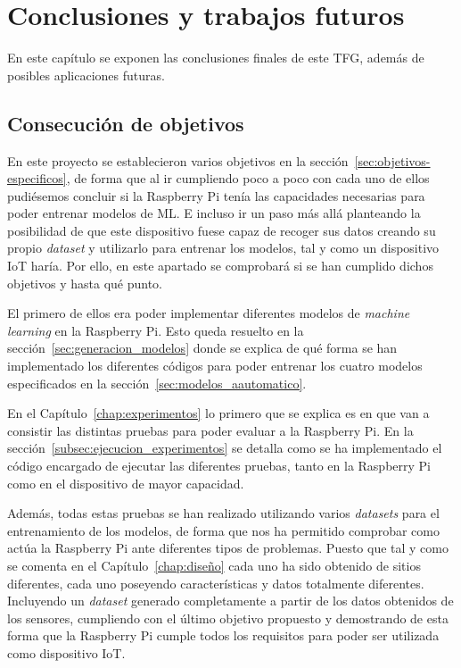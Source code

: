\documentclass[a4paper, 12pt]{book}
\begin{document}
\cleardoublepage



\chapter{Conclusiones y trabajos futuros}
\label{chap:conclusiones}

En este capítulo se exponen las conclusiones finales de este TFG, además de posibles aplicaciones futuras.

\section{Consecución de objetivos}
\label{sec:consecucion-objetivos}

En este proyecto se establecieron varios objetivos en la sección~\ref{sec:objetivos-especificos}, de forma que al ir cumpliendo poco a poco con cada uno de ellos pudiésemos concluir si la Raspberry Pi tenía las capacidades necesarias para poder entrenar modelos de ML. E incluso ir un paso más allá planteando la posibilidad de que este dispositivo fuese capaz de recoger sus datos creando su propio \textit{dataset} y utilizarlo para entrenar los modelos, tal y como un dispositivo IoT haría. Por ello, en este apartado se comprobará si se han cumplido dichos objetivos y hasta qué punto.

El primero de ellos era poder implementar diferentes modelos de \textit{machine learning} en la Raspberry Pi. Esto queda resuelto en la sección~\ref{sec:generacion_modelos} donde se explica de qué forma se han implementado los diferentes códigos para poder entrenar los cuatro modelos especificados en la sección~\ref{sec:modelos_aautomatico}.

En el Capítulo~\ref{chap:experimentos} lo primero que se explica es en que van a consistir las distintas pruebas para poder evaluar a la Raspberry Pi. En la sección~\ref{subsec:ejecucion_experimentos} se detalla como se ha implementado el código encargado de ejecutar las diferentes pruebas, tanto en la Raspberry Pi como en el dispositivo de mayor capacidad.

Además, todas estas pruebas se han realizado utilizando varios \textit{datasets} para el entrenamiento de los modelos, de forma que nos ha permitido comprobar como actúa la Raspberry Pi ante diferentes tipos de problemas. Puesto que tal y como se comenta en el Capítulo~\ref{chap:diseño} cada uno ha sido obtenido de sitios diferentes, cada uno poseyendo características y datos totalmente diferentes. Incluyendo un \textit{dataset} generado completamente a partir de los datos obtenidos de los sensores, cumpliendo con el último objetivo propuesto y demostrando de esta forma que la Raspberry Pi cumple todos los requisitos para poder ser utilizada como dispositivo IoT.
\end{document}
